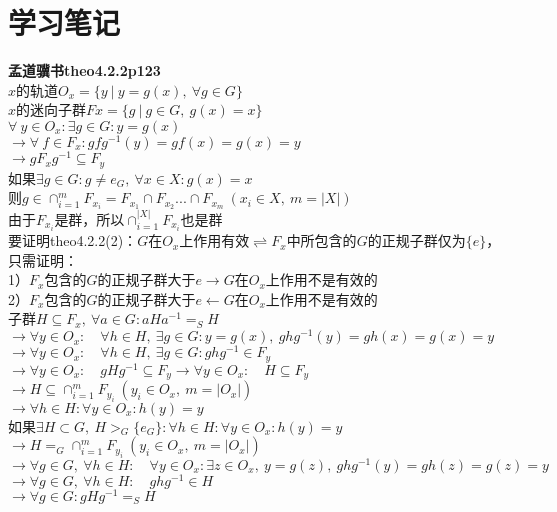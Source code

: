 \section{学习笔记}

\noindent\textbf{孟道骥书\cite{meng2010}theo4.2.2p123}\\

\noindent $x$的轨道$O_{x}=\{y\ |\ y=g(x),\ \forall g\in G\}$\\
$x$的迷向子群$Fx=\{g\ |\ g\in G,\ g(x)=x\}$\\

\noindent$\forall\ y \in O_{x}:\exists g\in G:y=g(x)$\\
$\rightarrow \forall\ f\in F_{x}:gfg^{-1}(y)=gf(x)=g(x)=y$\\
$\rightarrow gF_{x}g^{-1}\subseteq F_{y}$\\

\noindent 如果$\exists g\in G:g\neq e_{G},\ \forall x\in X:g(x)=x$\\
则$g\in \cap_{i=1}^{m} F_{x_{i}}= F_{x_{1}}\cap F_{x_{2}}...\cap F_{x_{m}} \ (x_{i}\in X,\ m=|X|)$\\
由于$F_{x_{i}}$是群，所以$\cap_{i=1}^{|X|} F_{x_{i}}$也是群\\

\noindent 要证明theo4.2.2(2)：$G$在$O_{x}$上作用有效$\rightleftharpoons$$F_{x}$中所包含的$G$的正规子群仅为$\{e\}$，只需证明：\\
1）$F_{x}$包含的$G$的正规子群大于${e}$$\rightarrow$$G$在$O_{x}$上作用不是有效的\\
2）$F_{x}$包含的$G$的正规子群大于${e}$$\leftarrow$$G$在$O_{x}$上作用不是有效的\\

\noindent 子群$H\subseteq F_{x},\ \forall a\in G:aHa^{-1}=_{S}H$\\
$\rightarrow \forall y\in O_{x}:\quad \forall h\in H,\ \exists g\in G:y=g(x),\ ghg^{-1}(y)=gh(x)=g(x)=y$\\
$\rightarrow \forall y\in O_{x}:\quad \forall h\in H,\ \exists g\in G:ghg^{-1}\in F_{y}$\\
$\rightarrow \forall y\in O_{x}:\quad gHg^{-1}\subseteq F_{y}\rightarrow \forall y\in O_{x}:\quad H\subseteq F_{y}$\\
$\rightarrow H\subseteq \cap_{i=1}^{m} F_{y_{i}}\ (y_{i}\in O_{x},\ m=|O_{x}|)$\\
$\rightarrow \forall h\in H:\forall y\in O_{x}:h(y)=y$\\

\noindent 如果$\exists H\subset G,\ H>_{G}\{e_{G}\}:\forall h\in H:\forall y\in O_{x}:h(y)=y$\\
$\rightarrow H=_{G}\cap_{i=1}^{m} F_{y_{i}}\ (y_{i}\in O_{x},\ m=|O_{x}|)$\\
$\rightarrow\forall g\in G,\ \forall h\in H:\quad\forall y\in O_{x}:\exists z\in O_{x},\ y=g(z),\ ghg^{-1}(y)=gh(z)=g(z)=y$\\
$\rightarrow\forall g\in G,\ \forall h\in H:\quad ghg^{-1}\in H$\\
$\rightarrow\forall g\in G:gHg^{-1}=_{S}H$\\
